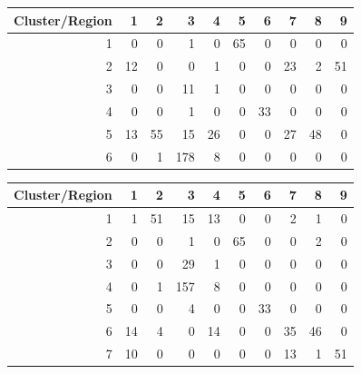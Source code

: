 \documentclass[12pt, leqno]{article}
\begin{document}
\begin{table}[ht]
\centering
\begin{tabular}{rrrrrrrrrr}
  \hline
Cluster/Region & 1 & 2 & 3 & 4 & 5 & 6 & 7 & 8 & 9 \\ 
  \hline
1 &   0 &   0 &   1 &   0 &  65 &   0 &   0 &   0 &   0 \\ 
  2 &  12 &   0 &   0 &   1 &   0 &   0 &  23 &   2 &  51 \\ 
  3 &   0 &   0 &  11 &   1 &   0 &   0 &   0 &   0 &   0 \\ 
  4 &   0 &   0 &   1 &   0 &   0 &  33 &   0 &   0 &   0 \\ 
  5 &  13 &  55 &  15 &  26 &   0 &   0 &  27 &  48 &   0 \\ 
  6 &   0 &   1 & 178 &   8 &   0 &   0 &   0 &   0 &   0 \\ 
   \hline
\end{tabular}
\end{table}

\begin{table}[ht]
\centering
\begin{tabular}{rrrrrrrrrr}
  \hline
Cluster/Region & 1 & 2 & 3 & 4 & 5 & 6 & 7 & 8 & 9 \\ 
  \hline
1 &   1 &  51 &  15 &  13 &   0 &   0 &   2 &   1 &   0 \\ 
  2 &   0 &   0 &   1 &   0 &  65 &   0 &   0 &   2 &   0 \\ 
  3 &   0 &   0 &  29 &   1 &   0 &   0 &   0 &   0 &   0 \\ 
  4 &   0 &   1 & 157 &   8 &   0 &   0 &   0 &   0 &   0 \\ 
  5 &   0 &   0 &   4 &   0 &   0 &  33 &   0 &   0 &   0 \\ 
  6 &  14 &   4 &   0 &  14 &   0 &   0 &  35 &  46 &   0 \\ 
  7 &  10 &   0 &   0 &   0 &   0 &   0 &  13 &   1 &  51 \\ 
   \hline
\end{tabular}
\end{table}
\end{document}
